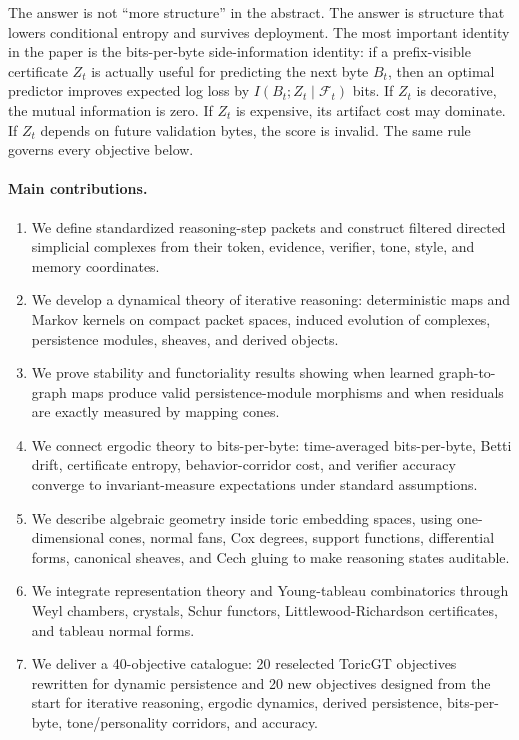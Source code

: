 \documentclass[10pt]{article}
\numberwithin{equation}{section}
\begin{document}
The answer is not ``more structure'' in the abstract. The answer is structure that lowers conditional entropy and survives deployment. The most important identity in the paper is the bits-per-byte side-information identity: if a prefix-visible certificate $Z_t$ is actually useful for predicting the next byte $B_t$, then an optimal predictor improves expected log loss by $I(B_t;Z_t\mid \mathcal{F}_t)$ bits. If $Z_t$ is decorative, the mutual information is zero. If $Z_t$ is expensive, its artifact cost may dominate. If $Z_t$ depends on future validation bytes, the score is invalid. The same rule governs every objective below.

\paragraph{Main contributions.}
\begin{enumerate}
\item We define standardized reasoning-step packets and construct filtered directed simplicial complexes from their token, evidence, verifier, tone, style, and memory coordinates.
\item We develop a dynamical theory of iterative reasoning: deterministic maps and Markov kernels on compact packet spaces, induced evolution of complexes, persistence modules, sheaves, and derived objects.
\item We prove stability and functoriality results showing when learned graph-to-graph maps produce valid persistence-module morphisms and when residuals are exactly measured by mapping cones.
\item We connect ergodic theory to bits-per-byte: time-averaged bits-per-byte, Betti drift, certificate entropy, behavior-corridor cost, and verifier accuracy converge to invariant-measure expectations under standard assumptions.
\item We describe algebraic geometry inside toric embedding spaces, using one-dimensional cones, normal fans, Cox degrees, support functions, differential forms, canonical sheaves, and Cech gluing to make reasoning states auditable.
\item We integrate representation theory and Young-tableau combinatorics through Weyl chambers, crystals, Schur functors, Littlewood-Richardson certificates, and tableau normal forms.
\item We deliver a 40-objective catalogue: 20 reselected ToricGT objectives rewritten for dynamic persistence and 20 new objectives designed from the start for iterative reasoning, ergodic dynamics, derived persistence, bits-per-byte, tone/personality corridors, and accuracy.
\end{enumerate}
\end{document}
